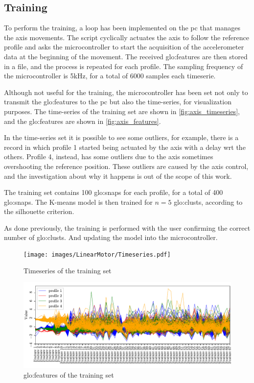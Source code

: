 \subsection{Training}
To perform the training, a loop has been implemented on the \gls{pc} that manages the axis movements. The script cyclically actuates the axis to follow the reference profile and asks the microcontroller to start the acquisition of the accelerometer data at the beginning of the movement. The received \gls{glo:feature}s are then stored in a file, and the process is repeated for each profile. The sampling frequency of the microcontroller is 5kHz, for a total of 6000 samples each timeserie. 

Although not useful for the training, the microcontroller has been set not only to transmit the \gls{glo:feature}s to the \gls{pc} but also the time-series, for visualization purposes. The time-series of the training set are shown in \autoref{fig:axis_timeseries}, and the \gls{glo:feature}s are shown in \autoref{fig:axis_features}.

In the time-series set it is possible to see some outliers, for example, there is a record in which profile 1 started being actuated by the axis with a delay \gls{wrt} the others. Profile 4, instead, has some outliers due to the axis sometimes overshooting the reference position. These outliers are caused by the axis control, and the investigation about why it happens is out of the scope of this work. 

The training set contains 100 \gls{glo:snap}s for each profile, for a total of 400 \gls{glo:snap}s. The K-means model is then trained for $n=5$ \gls{glo:clust}s, according to the silhouette criterion.

As done previously, the training is performed with the user confirming the correct number of \gls{glo:clust}s. And updating the model into the microcontroller.

\begin{figure}
    \centering
    \texttt{[image: images/LinearMotor/Timeseries.pdf]}
    \caption{Timeseries of the training set}
    \label{fig:axis_timeseries}
\end{figure}


\begin{figure}
    \centering
    \includegraphics[width=\textwidth]{images/LinearMotor/Features.pdf}
    \caption{\gls{glo:feature}s of the training set}
    \label{fig:axis_features}
\end{figure}

